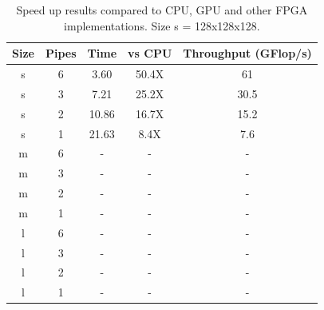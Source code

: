 \begin{table}[!h]
  \centering
  \caption{Speed up results compared to CPU, GPU and other FPGA implementations. Size s = 128x128x128.}
  \label{speedup}
  \begin{tabular}{ ccccc}
    Size & Pipes & Time  & vs CPU & Throughput (GFlop/s) \\ \hline
    s    & 6     & 3.60  & 50.4X  & 61                   \\
    s    & 3     & 7.21  & 25.2X  & 30.5                 \\
    s    & 2     & 10.86 & 16.7X  & 15.2                 \\
    s    & 1     & 21.63 & 8.4X   & 7.6                  \\\hline
    m    & 6     & -     & -      & -                    \\
    m    & 3     & -     & -      & -                    \\
    m    & 2     & -     & -      & -                    \\
    m    & 1     & -     & -      & -                    \\ \hline
    l    & 6     & -     & -      & -                    \\
    l    & 3     & -     & -      & -                    \\
    l    & 2     & -     & -      & -                    \\
    l    & 1     & -     & -      & -                    \\
  \end{tabular}
\end{table}

